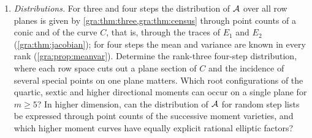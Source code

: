 \begin{enumerate}
Determine
the seven-step maximum at general $p>14$, where it is at most $6(p+1)+38$
(\cref{gra:thm:seven}), and the exact maximum for general odd $m$ and $p$.
For even $m\ge6$ the maximum is known for $2m\mid p-1$ and, when
$2(p+1)>m(m-2)$, for $m\mid p-1$ (\cref{gra:thm:evenmax}); does
$\graA_{\max}=m(p+1)$ hold at every $p>2m$ with $m\mid p-1$, $2m\nmid p-1$?
For $m\nmid p-1$ and large $p$ the maximum lies in
$[(m-2)(p+1),(m-2)(p+1)+m(m-2)]$; determine the bounded offset, which for
$m=6$ already takes several values and may differ between simple and
unrestricted lists. In rank $d\ge3$, what is the largest first nonzero
moment index, given that the rank-two barrier $t=s$ is excluded
(\cref{gra:thm:rigidity})?
\item \emph{Distributions.} For three and four steps the distribution of
$\mathcal{A}$ over all row planes is given by
\cref{gra:thm:three,gra:thm:census} through point counts of a conic and of
the curve $C$, that is, through the traces of $E_1$ and $E_2$
(\cref{gra:thm:jacobian}); for four steps the mean and variance are known
in every rank (\cref{gra:prop:meanvar}). Determine the rank-three
four-step distribution, where each row space cuts out a plane section of
$C$ and the incidence of several special points on one plane matters.
Which root configurations of the quartic, sextic and higher directional
moments can occur on a single plane for $m\ge5$? In higher dimension, can
the distribution of $\mathcal{A}$ for random step lists be expressed through
point counts of the successive moment varieties, and which higher moment
curves have equally explicit rational elliptic factors?
\end{enumerate}
